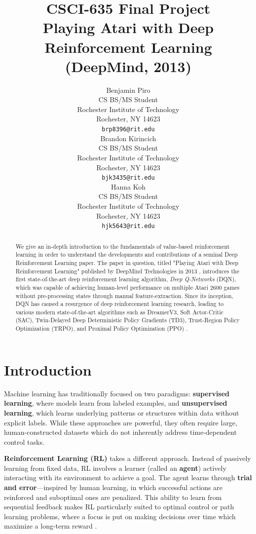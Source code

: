 \documentclass{article}
\title{CSCI-635 Final Project\\Playing Atari with Deep Reinforcement Learning\\(DeepMind, 2013)}
\author{%
  Benjamin Piro \\
  CS BS/MS Student\\
  Rochester Institute of Technology\\
  Rochester, NY 14623 \\
  \texttt{brp8396@rit.edu} \\
   \And
   Brandon Kirincich \\
   CS BS/MS Student \\
  Rochester Institute of Technology\\
  Rochester, NY 14623 \\
   \texttt{bjk3435@rit.edu} \\
   \And
   Hanna Koh \\
   CS BS/MS Student \\
  Rochester Institute of Technology\\
  Rochester, NY 14623 \\
   \texttt{hjk5643@rit.edu} \\
}
\begin{document}

\maketitle
\begin{abstract}
  \vspace{-3cm}We give an in-depth introduction to the fundamentals of value-based reinforcement learning in order to understand the developments and contributions of a seminal Deep Reinforcement Learning paper. The paper in question, titled "Playing Atari with Deep Reinforcement Learning" published by DeepMind Technologies in 2013 \cite{dqn}, introduces the first state-of-the-art deep reinforcement learning algorithm, \textit{Deep Q-Networks} (DQN), which was capable of achieving human-level performance on multiple Atari 2600 games without pre-processing states through manual feature-extraction. Since its inception, DQN has caused a resurgence of deep reinforcement learning research, leading to various modern state-of-the-art algorithms such as DreamerV3, Soft Actor-Critic (SAC), Twin-Delayed Deep Deterministic Policy Gradients (TD3), Trust-Region Policy Optimization (TRPO), and Proximal Policy Optimization (PPO) \cite{SpinningUp2018}.
\end{abstract}

\pagebreak
\tableofcontents



\pagebreak
\section{Introduction}

Machine learning has traditionally focused on two paradigms: \textbf{supervised learning}, where models learn from labeled examples, and \textbf{unsupervised learning}, which learns underlying patterns or structures within data without explicit labels. While these approaches are powerful, they often require large, human-constructed datasets which do not inherently address time-dependent control tasks.

\textbf{Reinforcement Learning (RL)} takes a different approach. Instead of passively learning from fixed data, RL involves a learner (called an \textbf{agent}) actively interacting with its environment to achieve a goal. The agent learns through \textbf{trial and error}---inspired by human learning, in which successful actions are reinforced and suboptimal ones are penalized. This ability to learn from sequential feedback makes RL particularly suited to optimal control or path learning problems, where a focus is put on making decisions over time which maximize a long-term reward \cite{Sutton1998}.
\end{document}
